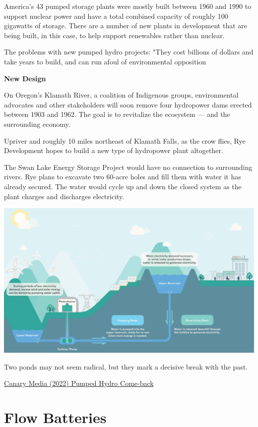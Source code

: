 \documentclass[
]{book}
\begin{document}
America's 43 pumped storage plants were mostly built between 1960 and 1990 to support nuclear power and have a total combined capacity of roughly 100 gigawatts of storage. There are a number of new plants in development that are being built, in this case, to help support renewables rather than nuclear.

The problems with new pumped hydro projects: "They cost billions of dollars and take years to build, and can run afoul of environmental opposition

\textbf{New Design}

On Oregon's Klamath River, a coalition of Indigenous groups, environmental advocates and other stakeholders will soon remove four hydropower dams erected between 1903 and 1962. The goal is to revitalize the ecosystem --- and the surrounding economy.

Upriver and roughly 10 miles northeast of Klamath Falls, as the crow flies, Rye Development hopes to build a new type of hydropower plant altogether.

The Swan Lake Energy Storage Project would have no connection to surrounding rivers. Rye plans to excavate two 60-acre holes and fill them with water it has already secured. The water would cycle up and down the closed system as the plant charges and discharges electricity.

\includegraphics{fig/pumped_hydro.png}

Two ponds may not seem radical, but they mark a decisive break with the past.

\href{https://www.canarymedia.com/articles/long-duration-energy-storage/pumped-hydro-grid-storage-could-be-poised-for-a-comeback}{Canary Media (2022) Pumped Hydro Come-back}

\hypertarget{flow-batteries-1}{%
\section{Flow Batteries}\label{flow-batteries-1}}
\end{document}
